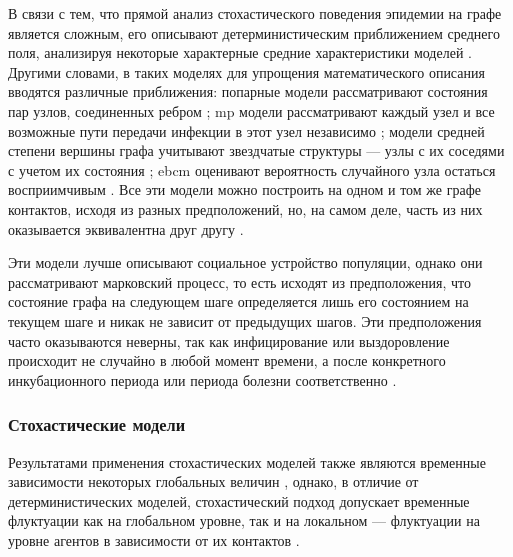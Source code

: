 \documentclass[a4paper,12pt]{article} %
\begin{document}
В связи с тем, что прямой анализ стохастического поведения эпидемии на графе является сложным, его описывают детерминистическим приближением среднего поля, анализируя некоторые характерные средние характеристики моделей \cite{sherborne2018mean}. Другими словами, в таких моделях для упрощения математического описания вводятся различные приближения: попарные модели рассматривают состояния пар узлов, соединенных ребром \cite{keeling1999effects, house2011insights}; \gls{mp} модели рассматривают каждый узел и все возможные пути передачи инфекции в этот узел независимо \cite{karrer2010message}; модели средней степени вершины графа учитывают звездчатые структуры --- узлы с их соседями с учетом их состояния \cite{lindquist2011effective}; \gls{ebcm} оценивают вероятность случайного узла остаться восприимчивым \cite{miller2012edge}. Все эти модели можно построить на одном и том же графе контактов, исходя из разных предположений, но, на самом деле, часть из них оказывается эквивалентна друг другу \cite{sherborne2018mean}.

Эти модели лучше описывают социальное устройство популяции, однако они рассматривают марковский процесс, то есть исходят из предположения, что состояние графа на следующем шаге определяется лишь его состоянием на текущем шаге и никак не зависит от предыдущих шагов. Эти предположения часто оказываются неверны, так как инфицирование или выздоровление происходит не случайно в любой момент времени, а после конкретного инкубационного периода или периода болезни соответственно \cite{keeling2005networks,volz2008sir,house2011insights}. 

\subsubsection{Стохастические модели}
Результатами применения стохастических моделей также являются временные зависимости некоторых глобальных величин \cite{aiello2003new,haas1999temporal}, однако, в отличие от детерминистических моделей, стохастический подход допускает временные флуктуации как на глобальном уровне, так и на локальном --- флуктуации на уровне агентов в зависимости от их контактов \cite{nakamura2017efficient}.
\end{document}
